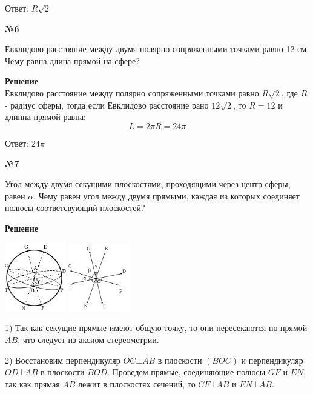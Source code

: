     Ответ: $R\sqrt{2}$


    \begin{center}
        \textbf{№6}
    \end{center}

    Евклидово расстояние между двумя полярно сопряженными точками равно 12 см.
    Чему равна длина прямой на сфере?

    \textbf{Решение}\\

    Евклидово расстояние между полярно сопряженными точками равно $R\sqrt{2}$, где $R$ - радиус сферы, тогда
    если Евклидово расстояние рано $12\sqrt{2}$, то $R = 12$ и длинна прямой равна:
    \[ L = 2\pi R = 24\pi\]

    Ответ: $24\pi$

    \begin{center}
        \textbf{№7}
    \end{center}

    Угол между двумя секущими плоскостями, проходящими через центр сферы, равен $\alpha$.
    Чему равен угол между двумя прямыми,
    каждая из которых соединяет полюсы соответсвующий плоскостей?

    \textbf{Решение}\\

    \begin{center}
        \includegraphics[width=0.2\textwidth]{images/img3} \quad
        \includegraphics[width=0.2\textwidth]{images/img4}\\
    \end{center}

    1) Так как секущие прямые имеют общую точку, то они пересекаются по прямой $AB$, что следует из аксиом стереометрии.

    2) Восстановим перпендикуляр $OC\bot AB$ в плоскости $(BOC)$ и перпендикуляр $OD \bot AB$ в плоскости $BOD$.
    Проведем прямые, соединяющие полюсы $GF$ и $EN$, так как прямая $AB$ лежит в плоскостях сечений,
    то $CF \bot AB$ и $EN \bot AB$.

